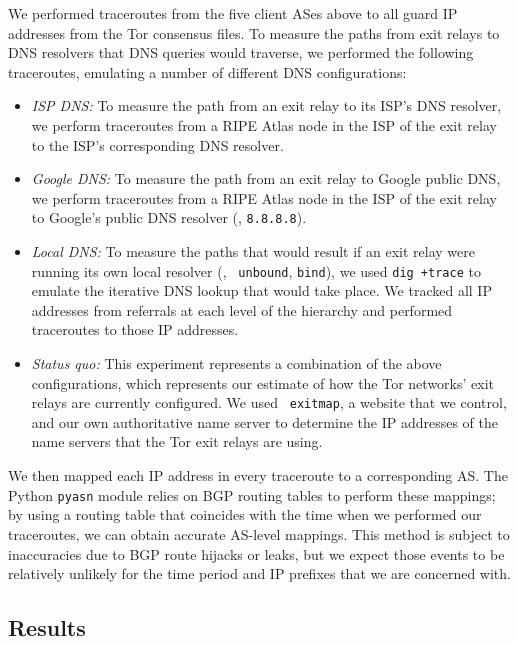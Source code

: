 We performed traceroutes from the five client ASes above to all guard IP
      addresses from the Tor consensus files. To measure the paths from
      exit relays to DNS resolvers that DNS queries would traverse, we
      performed the following traceroutes, emulating a number of
      different DNS configurations:
\begin{itemize}
    \item \emph{ISP DNS:} To measure the path from an exit relay to its
      ISP's DNS resolver, we perform traceroutes from a RIPE Atlas node
      in the ISP of the exit relay to the ISP's corresponding DNS resolver.

    \item \emph{Google DNS:} To measure the path from an exit relay to
      Google public DNS, we perform traceroutes from a RIPE Atlas node
      in the ISP of the exit relay to Google's public DNS resolver (\ie,
      {\tt 8.8.8.8}).

    \item \emph{Local DNS:} To measure the paths that would result if an
      exit relay were running its own local resolver (\eg, {\tt
        unbound}, {\tt bind}), we used {\tt dig +trace} to emulate the
      iterative DNS lookup that would take place. We tracked all IP
      addresses from referrals at each level of the hierarchy and
      performed traceroutes to those IP addresses.

    \item \emph{Status quo:} This experiment represents a combination of
      the above configurations, which represents our estimate of how the
      Tor networks' exit relays are currently configured. We used {\tt
        exitmap}, a website that we control, and our own authoritative
      name server to determine the IP addresses of the name servers that
      the Tor exit relays are using.
\end{itemize}
\noindent
We then mapped each IP address in every traceroute to a corresponding
AS.  The Python {\tt pyasn} module relies on BGP routing tables to
perform these mappings; by using a routing table that coincides with the
time when we performed our traceroutes, we can obtain accurate AS-level
mappings.  This method is subject to inaccuracies due to BGP route
hijacks or leaks, but we expect those events to be relatively unlikely
for the time period and IP prefixes that we are concerned with.

\subsection{Results}

